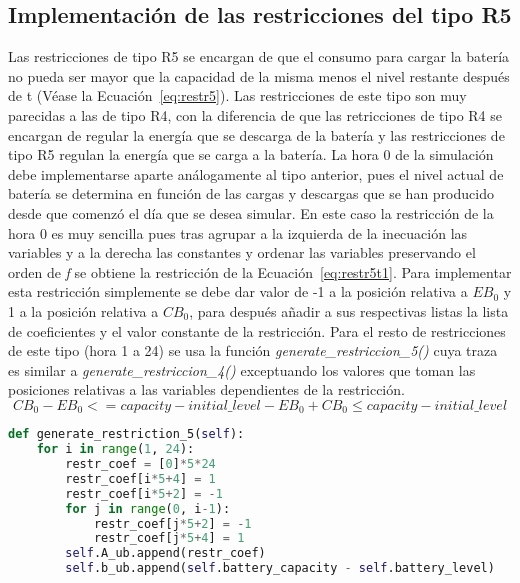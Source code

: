 \subsection{Implementación de las restricciones del tipo R5}
Las restricciones de tipo R5 se encargan de que el consumo para cargar la batería no pueda ser mayor que la capacidad de la misma menos el nivel restante después de t (Véase la Ecuación~\ref{eq:restr5}). Las restricciones de este tipo son muy parecidas a las de tipo R4, con la diferencia de que las retricciones de tipo R4 se encargan de regular la energía que se descarga de la batería y las restricciones de tipo R5 regulan la energía que se carga a la batería. La hora 0 de la simulación debe implementarse aparte análogamente al tipo anterior, pues el nivel actual de batería se determina en función de las cargas y descargas que se han producido desde que comenzó el día que se desea simular. En este caso la restricción de la hora 0 es muy sencilla pues tras agrupar a la izquierda de la inecuación las variables y a la derecha las constantes y ordenar las variables preservando el orden de \textit{f} se obtiene la restricción de la Ecuación~\ref{eq:restr5t1}. Para implementar esta restricción simplemente se debe dar valor de -1 a la posición relativa a $ EB_{0} $ y 1 a la posición relativa a $ CB_{0} $, para después añadir a sus respectivas listas la lista de coeficientes y el valor constante de la restricción. Para el resto de restricciones de este tipo (hora 1 a 24) se usa la función \textit{generate\_restriccion\_5()} cuya traza es similar a \textit{generate\_restriccion\_4()} exceptuando los valores que toman las posiciones relativas a las variables dependientes de la restricción.
\begin{equation}
  \label{eq:restr5t1}
  CB_{0} - EB_{0} <= capacity - initial\_level
  -EB_{0} + CB_{0} \leq capacity - initial\_level
\end{equation}
\begin{lstlisting}[language=Python,float=ht,caption={Restricciones del tipo 5},label={lst:restr5}]
def generate_restriction_5(self):
    for i in range(1, 24):
        restr_coef = [0]*5*24
        restr_coef[i*5+4] = 1
        restr_coef[i*5+2] = -1
        for j in range(0, i-1):
            restr_coef[j*5+2] = -1
            restr_coef[j*5+4] = 1
        self.A_ub.append(restr_coef)
        self.b_ub.append(self.battery_capacity - self.battery_level)
\end{lstlisting}
